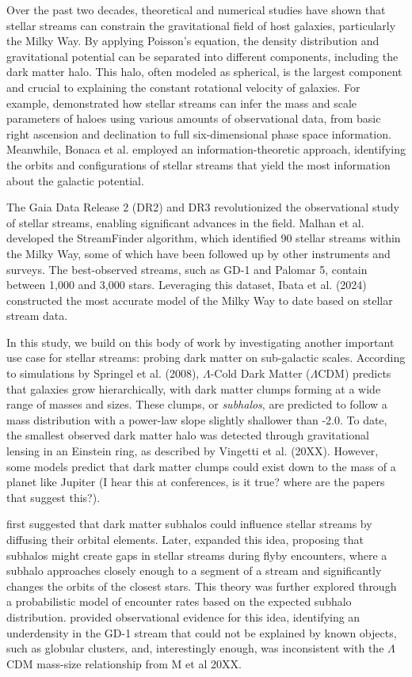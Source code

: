 \documentclass[draft]{aa}
\begin{document}
  Over the past two decades, theoretical and numerical studies have shown that stellar streams can constrain the gravitational field of host galaxies, particularly the Milky Way. By applying Poisson's equation, the density distribution and gravitational potential can be separated into different components, including the dark matter halo. This halo, often modeled as spherical, is the largest component and crucial to explaining the constant rotational velocity of galaxies. For example, \citet{varghese2011stellar} demonstrated how stellar streams can infer the mass and scale parameters of haloes using various amounts of observational data, from basic right ascension and declination to full six-dimensional phase space information. Meanwhile, Bonaca et al. employed an information-theoretic approach, identifying the orbits and configurations of stellar streams that yield the most information about the galactic potential.

  The Gaia Data Release 2 (DR2) and DR3 revolutionized the observational study of stellar streams, enabling significant advances in the field. Malhan et al. developed the StreamFinder algorithm, which identified 90 stellar streams within the Milky Way, some of which have been followed up by other instruments and surveys. The best-observed streams, such as GD-1 and Palomar 5, contain between 1,000 and 3,000 stars. Leveraging this dataset, Ibata et al. (2024) constructed the most accurate model of the Milky Way to date based on stellar stream data.

  In this study, we build on this body of work by investigating another important use case for stellar streams: probing dark matter on sub-galactic scales. According to simulations by Springel et al. (2008), $\Lambda$-Cold Dark Matter ($\Lambda$CDM) predicts that galaxies grow hierarchically, with dark matter clumps forming at a wide range of masses and sizes. These clumps, or \textit{subhalos}, are predicted to follow a mass distribution with a power-law slope slightly shallower than -2.0. To date, the smallest observed dark matter halo was detected through gravitational lensing in an Einstein ring, as described by Vingetti et al. (20XX). However, some models predict that dark matter clumps could exist down to the mass of a planet like Jupiter (I hear this at conferences, is it true? where are the papers that suggest this?).

  \citet{rodrigo_ibata_uncovering_2002} first suggested that dark matter subhalos could influence stellar streams by diffusing their orbital elements. Later, \citet{r_g_carlberg_pal_2012} expanded this idea, proposing that subhalos might create gaps in stellar streams during flyby encounters, where a subhalo approaches closely enough to a segment of a stream and significantly changes the orbits of the closest stars. This theory was further explored through a probabilistic model of encounter rates based on the expected subhalo distribution. \citet{bonaca_spur_2018} provided observational evidence for this idea, identifying an underdensity in the GD-1 stream that could not be explained by known objects, such as globular clusters, and, interestingly enough, was inconsistent with the $\Lambda$CDM mass-size relationship from M et al 20XX.
\end{document}
